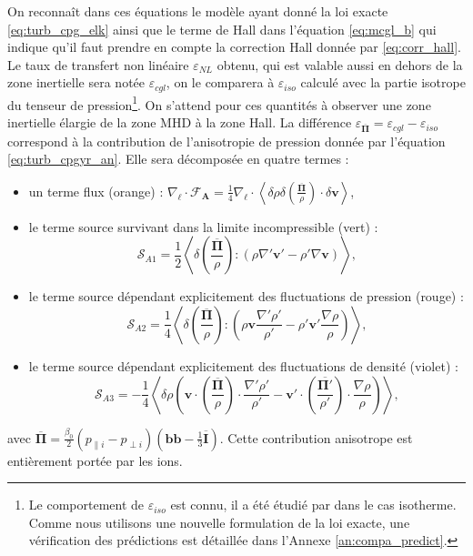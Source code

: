 On reconnaît dans ces équations le modèle ayant donné la loi exacte \eqref{eq:turb_cpg_elk} ainsi que le terme de \acs{Hall} dans l'équation \eqref{eq:mcgl_b} qui indique qu'il faut prendre en compte la correction \acs{Hall} donnée par \eqref{eq:corr_hall}.  Le taux de transfert non linéaire $\varepsilon_{NL}$ obtenu, qui est valable aussi en dehors de la zone inertielle sera notée $\varepsilon_{cgl}$, on le comparera à $\varepsilon_{iso}$ calculé avec la partie isotrope du tenseur de pression\footnote{Le comportement de $\varepsilon_{iso}$ est connu, il a été étudié par \cite{andres_energy_2018} dans le cas isotherme. Comme nous utilisons une nouvelle formulation de la loi exacte, une vérification des prédictions est détaillée dans l'Annexe \ref{an:compa_predict}.}. On s'attend pour ces quantités à observer une zone inertielle élargie de la zone \acs{MHD} à la zone \acs{Hall}. 
La différence $\varepsilon_{\overline{\boldsymbol{\Pi}}}=\varepsilon_{cgl}-\varepsilon_{iso}$ correspond à la contribution de l'anisotropie de pression donnée par l'équation \eqref{eq:turb_cpgyr_an}. Elle sera décomposée en quatre termes : 
\begin{itemize}
    \item un terme flux (orange) : $\nabla_{\boldsymbol{\ell}} \cdot \boldsymbol{\mathcal{F}_A} = \frac{1}{4} \nabla_{\boldsymbol{\ell}} \cdot \left< \delta \rho \delta \left(\frac{\overline{\boldsymbol{\Pi}}}{\rho}\right) \cdot \delta \boldsymbol{v} \right> $,
    \item le terme source survivant dans la limite incompressible (vert) : 
    \begin{equation*}
        \mathcal{S}_{A1} = \frac{1}{2}\left<  \delta \left(\frac{\overline{\boldsymbol{\Pi}}}{\rho}\right) : \left(\rho\nabla' \boldsymbol{v'} -  \rho'\nabla  \boldsymbol{v}\right)\right>,
    \end{equation*}
    \item le terme source dépendant explicitement des fluctuations de pression (rouge) : 
    \begin{equation*}
        \mathcal{S}_{A2} =  \frac{1}{4}  \left<\delta \left(\frac{\overline{\boldsymbol{\Pi}}}{\rho}\right) : \left(\rho \boldsymbol{v} \frac{\nabla' \rho'}{\rho'} -\rho'\boldsymbol{v'}  \frac{\nabla \rho}{\rho} \right)  \right>,
    \end{equation*}
    \item le terme source dépendant explicitement des fluctuations de densité (violet) : 
    \begin{equation*}
        \mathcal{S}_{A3} = - \frac{1}{4}\left< \delta \rho \left(  \boldsymbol{v} \cdot   \left(\frac{\overline{\boldsymbol{\Pi}}}{\rho}\right) \cdot  \frac{\nabla' \rho'}{\rho'} - \boldsymbol{v'} \cdot \left(\frac{\overline{\boldsymbol{\Pi'}}}{\rho'}\right) \cdot  \frac{\nabla \rho}{\rho}\right) \right>,
    \end{equation*}
\end{itemize}
avec $\overline{\boldsymbol{\Pi}} =  \frac{\beta_0}{2} \left(p_{\parallel i } - p_{\perp i }\right)\left( \boldsymbol{b} \boldsymbol{b} - \frac{1}{3}  \overline{\boldsymbol{I}} \right)$. Cette contribution anisotrope est entièrement portée par les ions.

